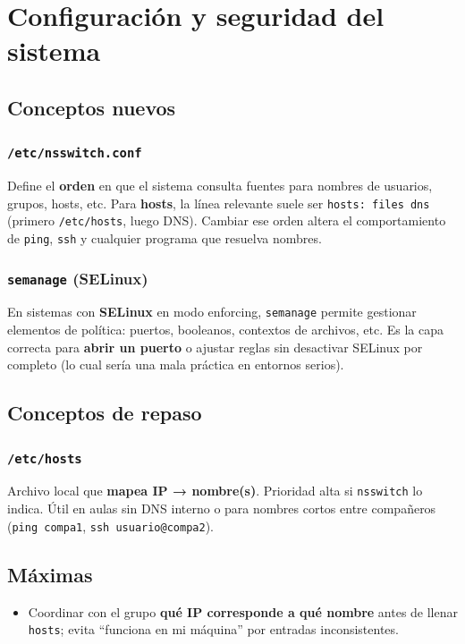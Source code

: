 \documentclass[11pt, letterpaper]{article}
\begin{document}
\section{Configuración y seguridad del sistema}
\label{sec:org9d2c7c2}

\subsection{Conceptos nuevos}
\label{sec:orgbf25601}

\subsubsection{\texttt{/etc/nsswitch.conf}}
\label{sec:org98e8793}
Define el \textbf{orden} en que el sistema consulta fuentes para nombres de usuarios, grupos, hosts, etc. Para \textbf{hosts}, la línea relevante suele ser \texttt{hosts: files dns} (primero \texttt{/etc/hosts}, luego DNS). Cambiar ese orden altera el comportamiento de \texttt{ping}, \texttt{ssh} y cualquier programa que resuelva nombres.
\subsubsection{\texttt{semanage} (SELinux)}
\label{sec:orgf91d762}
En sistemas con \textbf{SELinux} en modo enforcing, \texttt{semanage} permite gestionar elementos de política: puertos, booleanos, contextos de archivos, etc. Es la capa correcta para \textbf{abrir un puerto} o ajustar reglas sin desactivar SELinux por completo (lo cual sería una mala práctica en entornos serios).
\subsection{Conceptos de repaso}
\label{sec:orgd537396}

\subsubsection{\texttt{/etc/hosts}}
\label{sec:orgcf4406a}
Archivo local que \textbf{mapea IP → nombre(s)}. Prioridad alta si \texttt{nsswitch} lo indica. Útil en aulas sin DNS interno o para nombres cortos entre compañeros (\texttt{ping compa1}, \texttt{ssh usuario@compa2}).
\subsection{Máximas}
\label{sec:org9523b9d}
\begin{itemize}
\item Coordinar con el grupo \textbf{qué IP corresponde a qué nombre} antes de llenar \texttt{hosts}; evita “funciona en mi máquina” por entradas inconsistentes.
\end{itemize}
\end{document}
